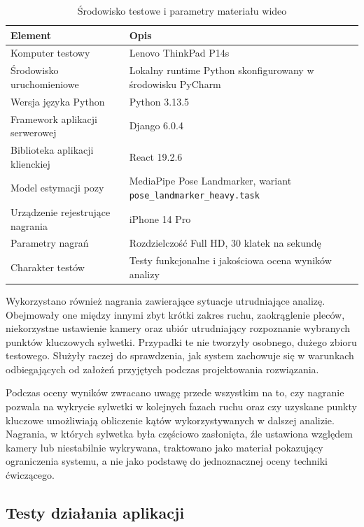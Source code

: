 \begin{table}[H]
\centering
\caption{Środowisko testowe i parametry materiału wideo}
\label{tab:srodowisko-testowe}
\begin{tabular}{|
>{\raggedright\arraybackslash}p{4.5cm}|
>{\raggedright\arraybackslash}p{8cm}|}
\hline
\textbf{Element} & \textbf{Opis} \\ \hline
Komputer testowy & Lenovo ThinkPad P14s \\ \hline
Środowisko uruchomieniowe & Lokalny runtime Python skonfigurowany w środowisku PyCharm \\ \hline
Wersja języka Python & Python 3.13.5 \\ \hline
Framework aplikacji serwerowej & Django 6.0.4 \\ \hline
Biblioteka aplikacji klienckiej & React 19.2.6 \\ \hline
Model estymacji pozy & MediaPipe Pose Landmarker, wariant \texttt{pose\_landmarker\_heavy.task} \\ \hline
Urządzenie rejestrujące nagrania & iPhone 14 Pro \\ \hline
Parametry nagrań & Rozdzielczość Full HD, 30 klatek na sekundę \\ \hline
Charakter testów & Testy funkcjonalne i jakościowa ocena wyników analizy \\ \hline
\end{tabular}
\end{table}

Wykorzystano również nagrania zawierające sytuacje utrudniające analizę. Obejmowały one między innymi zbyt krótki zakres ruchu, zaokrąglenie pleców, niekorzystne ustawienie kamery oraz ubiór utrudniający rozpoznanie wybranych punktów kluczowych sylwetki. Przypadki te nie tworzyły osobnego, dużego zbioru testowego. Służyły raczej do sprawdzenia, jak system zachowuje się w warunkach odbiegających od założeń przyjętych podczas projektowania rozwiązania.

Podczas oceny wyników zwracano uwagę przede wszystkim na to, czy nagranie pozwala na wykrycie sylwetki w kolejnych fazach ruchu oraz czy uzyskane punkty kluczowe umożliwiają obliczenie kątów wykorzystywanych w dalszej analizie. Nagrania, w których sylwetka była częściowo zasłonięta, źle ustawiona względem kamery lub niestabilnie wykrywana, traktowano jako materiał pokazujący ograniczenia systemu, a nie jako podstawę do jednoznacznej oceny techniki ćwiczącego.

\subsection{Testy działania aplikacji}

